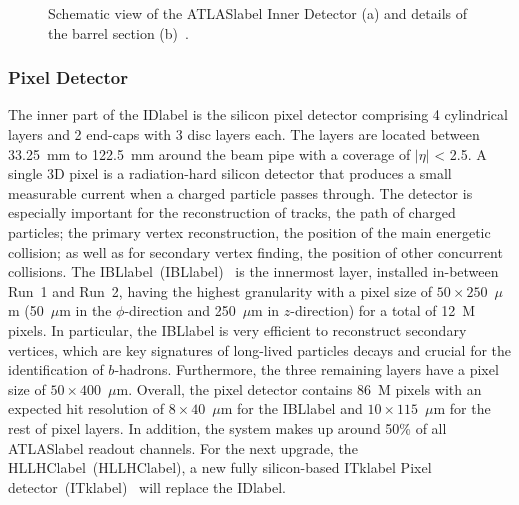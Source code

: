 \begin{figure}[htbp]
    \RawFloats
    \begin{center}
    \quad
    \caption{
        Schematic view of the \acrshort{ATLASlabel} Inner Detector (a) and details of the barrel section (b)~\cite{Collaboration_2008}. 
    }
    \label{figLHC:ATLASID}
    \end{center}
\end{figure}

\subsubsection*{Pixel Detector}

The inner part of the \acrshort{IDlabel} is the silicon pixel detector comprising 4 cylindrical layers and 2 end-caps with 3 disc layers each. The layers are located between 33.25~mm to 122.5~mm around the beam pipe with a coverage of $|\eta|$ < 2.5. A single 3D pixel is a radiation-hard silicon detector that produces a small measurable current when a charged particle passes through. The detector is especially important for the reconstruction of tracks, the path of charged particles; the primary vertex reconstruction, the position of the main energetic collision; as well as for secondary vertex finding, the position of other concurrent collisions. The \acrlong{IBLlabel}~(\acrshort{IBLlabel})~\cite{Capeans:1291633} is the innermost layer, installed in-between Run~1 and Run~2, having the highest granularity with a pixel size of $50\times 250$~$\mu$m (50~$\mu$m in the $\phi$-direction and 250~$\mu$m in $z$-direction) for a total of 12~M pixels. In particular, the \acrshort{IBLlabel} is very efficient to reconstruct secondary vertices, which are key signatures of long-lived particles decays and crucial for the identification of $b$-hadrons. Furthermore, the three remaining layers have a pixel size of $50\times 400$~$\mu$m. Overall, the pixel detector contains 86~M pixels with an expected hit resolution of $8\times 40$~$\mu$m for the \acrshort{IBLlabel} and $10\times 115$~$\mu$m for the rest of pixel layers. In addition, the system makes up around 50\% of all \acrshort{ATLASlabel} readout channels. For the next upgrade, the \acrlong{HLLHClabel}~(\acrshort{HLLHClabel}), a new fully silicon-based \acrlong{ITklabel} Pixel detector~(\acrshort{ITklabel})~\cite{CERN-LHCC-2017-021} will replace the \acrshort{IDlabel}.


